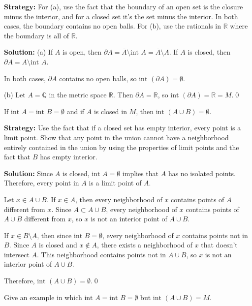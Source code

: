 \noindent\textbf{Strategy:} For (a), use the fact that the boundary of an open set is the closure minus the interior, and for a closed set it's the set minus the interior. In both cases, the boundary contains no open balls. For (b), use the rationals in $\mathbb{R}$ where the boundary is all of $\mathbb{R}$.

\bigskip\noindent\textbf{Solution:} 
(a) If $A$ is open, then $\partial A = \overline{A} \setminus \text{int } A = \overline{A} \setminus A$. If $A$ is closed, then $\partial A = A \setminus \text{int } A$.

In both cases, $\partial A$ contains no open balls, so $\text{int } (\partial A) = \emptyset$.

(b) Let $A = \mathbb{Q}$ in the metric space $\mathbb{R}$. Then $\partial A = \mathbb{R}$, so $\text{int } (\partial A) = \mathbb{R} = M$.\qed


\begin{problembox}
If \(\text{int } A = \text{int } B = \emptyset\) and if \(A\) is closed in \(M\), then \(\text{int } (A \cup B) = \emptyset\).
\end{problembox}

\noindent\textbf{Strategy:} Use the fact that if a closed set has empty interior, every point is a limit point. Show that any point in the union cannot have a neighborhood entirely contained in the union by using the properties of limit points and the fact that $B$ has empty interior.

\bigskip\noindent\textbf{Solution:} Since $A$ is closed, $\text{int } A = \emptyset$ implies that $A$ has no isolated points. Therefore, every point in $A$ is a limit point of $A$.

Let $x \in A \cup B$. If $x \in A$, then every neighborhood of $x$ contains points of $A$ different from $x$. Since $A \subset A \cup B$, every neighborhood of $x$ contains points of $A \cup B$ different from $x$, so $x$ is not an interior point of $A \cup B$.

If $x \in B \setminus A$, then since $\text{int } B = \emptyset$, every neighborhood of $x$ contains points not in $B$. Since $A$ is closed and $x \notin A$, there exists a neighborhood of $x$ that doesn't intersect $A$. This neighborhood contains points not in $A \cup B$, so $x$ is not an interior point of $A \cup B$.

Therefore, $\text{int } (A \cup B) = \emptyset$.\qed


\begin{problembox}
Give an example in which \(\text{int } A = \text{int } B = \emptyset\) but \(\text{int } (A \cup B) = M\).
\end{problembox}

